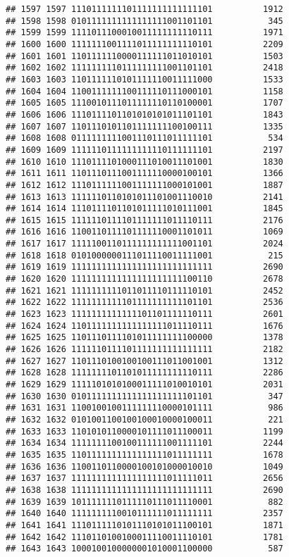 \documentclass[]{article}
\begin{document}
\begin{verbatim}
## 1597 1597 1110111111101111111111111101          1912
## 1598 1598 0101111111111111111001101101           345
## 1599 1599 1111011100010011111111110111          1971
## 1600 1600 1111111001111011111111110101          2209
## 1601 1601 1101111110000111111011010101          1503
## 1602 1602 1111111110111111111001101101          2418
## 1603 1603 1101111110101111110011111000          1533
## 1604 1604 1100111111100111110111000101          1158
## 1605 1605 1110010111011111110110100001          1707
## 1606 1606 1110111101101010101011101101          1843
## 1607 1607 1101110101101111111100100111          1335
## 1608 1608 0111111111001110111011111101           534
## 1609 1609 1111110111111111110111111101          2197
## 1610 1610 1110111101000111010011101001          1830
## 1611 1611 1101110111001111110000100101          1366
## 1612 1612 1110111111001111111000101001          1887
## 1613 1613 1111110110101011101001110010          2141
## 1614 1614 1110111101101011111010111001          1845
## 1615 1615 1111110111101111111011110111          2176
## 1616 1616 1100110111101111110001101011          1069
## 1617 1617 1111100110111111111111001101          2024
## 1618 1618 0101000000111011110011111001           215
## 1619 1619 1111111111111111111111111111          2690
## 1620 1620 1111111111111111111111100110          2678
## 1621 1621 1111111111011011110111110101          2452
## 1622 1622 1111111111101111111111101101          2536
## 1623 1623 1111111111111101101111110111          2601
## 1624 1624 1101111111111111111011110111          1676
## 1625 1625 1101110111101011111111100000          1378
## 1626 1626 1111110111101111111111111111          2182
## 1627 1627 1101110100100100111011001001          1312
## 1628 1628 1111111101101011111111110111          2286
## 1629 1629 1111101010100011111010010101          2031
## 1630 1630 0101111111111111111111101101           347
## 1631 1631 1100100100111111110000101111           986
## 1632 1632 0101001100100100010000100011           221
## 1633 1633 1101010110000101111011100011          1199
## 1634 1634 1111111100100111111001111101          2244
## 1635 1635 1101111111111111111011111111          1678
## 1636 1636 1100110110000100101000010010          1049
## 1637 1637 1111111111111111111011111011          2656
## 1638 1638 1111111111111111111111111111          2690
## 1639 1639 1011111110111110111011110001           882
## 1640 1640 1111111110010111111011111111          2357
## 1641 1641 1110111110101110101011100101          1871
## 1642 1642 1110110100100011110011110101          1781
## 1643 1643 1000100100000001010001100000           587

\end{verbatim}
\end{document}
